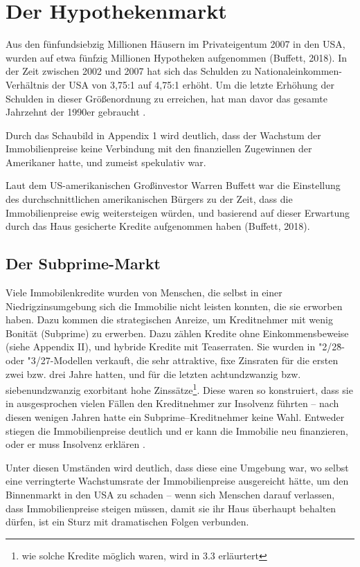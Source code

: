 \documentclass[a4paper,draft,11pt]{report}
\begin{document}
\section{Der Hypothekenmarkt}
Aus den f\"unfundsiebzig Millionen H\"ausern im
Privateigentum 2007 in den USA, wurden auf etwa f\"unfzig Millionen
Hypotheken aufgenommen (Buffett, 2018).
In der Zeit zwischen 2002 und 2007 hat sich das
Schulden zu Nationaleinkommen-Verhältnis
der USA von 3,75:1 auf 4,75:1 erhöht.
Um die letzte Erhöhung der Schulden in
dieser Größenordnung zu erreichen, hat man davor
das gesamte Jahrzehnt der 1990er
gebraucht \parencite[S. 195f.]{acharyar}.

Durch das Schaubild in Appendix 1 wird deutlich,
dass der Wachstum der Immobilienpreise keine Verbindung
mit den finanziellen Zugewinnen der Amerikaner hatte,
und zumeist spekulativ war. 

Laut dem US-amerikanischen
Großinvestor Warren Buffett war die Einstellung
des durchschnittlichen amerikanischen
B\"urgers zu der Zeit,
dass die Immobilienpreise ewig weitersteigen w\"urden,
und basierend auf dieser Erwartung durch das Haus
gesicherte Kredite aufgenommen haben (Buffett, 2018).

\subsection{Der Subprime-Markt}
Viele Immobilenkredite wurden von Menschen, die selbst
in einer Niedrigzinsumgebung sich die Immobilie nicht leisten
konnten, die sie erworben haben.
Dazu kommen die strategischen Anreize, um Kreditnehmer
mit wenig Bonit\"at (Subprime) zu erwerben. Dazu z\"ahlen
Kredite ohne Einkommensbeweise (siehe Appendix II), 
und hybride Kredite mit Teaserraten. Sie wurden in "2/28\"\-- oder
"3/27\"\--Modellen verkauft, die sehr attraktive, fixe Zinsraten
f\"ur die ersten zwei bzw. drei Jahre hatten, und
f\"ur die letzten achtundzwanzig bzw.
siebenundzwanzig exorbitant hohe Zinss\"atze\footnote{
  wie solche Kredite m\"oglich waren, wird in 3.3 erl\"aurtert}.
Diese waren so konstruiert, dass sie in ausgesprochen vielen
F\"allen den Kreditnehmer zur Insolvenz f\"uhrten --
nach diesen wenigen Jahren hatte ein Subprime--Kreditnehmer
keine Wahl. Entweder stiegen die Immobilienpreise deutlich
und er kann die Immobilie neu finanzieren, oder er muss
Insolvenz erkl\"aren \parencite[S. 208]{acharyar}.

Unter diesen Umst\"anden wird deutlich, dass diese eine
Umgebung war, wo selbst eine verringterte Wachstumsrate
der Immobilienpreise ausgereicht h\"atte,
um den Binnenmarkt in den USA zu schaden -- wenn sich
Menschen darauf verlassen, dass Immobilienpreise
steigen m\"ussen, damit sie ihr Haus \"uberhaupt behalten
d\"urfen, ist ein Sturz mit dramatischen Folgen verbunden.
\end{document}
